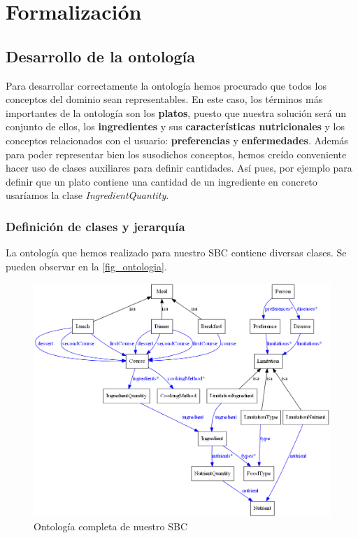 \documentclass[11]{article}
\begin{document}
\section{Formalización}

\subsection{Desarrollo de la ontología}
Para desarrollar correctamente la ontología hemos procurado que todos los conceptos del dominio sean representables. En este caso, los términos más importantes de la ontología son los \textbf{platos}, puesto que nuestra solución será un conjunto de ellos, los \textbf{ingredientes} y sus \textbf{características nutricionales} y los conceptos relacionados con el usuario: \textbf{preferencias} y \textbf{enfermedades}. Además para poder representar bien los susodichos conceptos, hemos creído conveniente hacer uso de clases auxiliares para definir cantidades. Así pues, por ejemplo para definir que un plato contiene una cantidad de un ingrediente en concreto usaríamos la clase \textit{IngredientQuantity}.
\label{ontologia_apartado}
\subsubsection{Definición de clases y jerarquía}

La ontología que hemos realizado para nuestro SBC contiene diversas clases. Se pueden observar en la \autoref{fig_ontologia}.

\begin{figure}[H]
\centering
\includegraphics[width=\textwidth,height=\textheight,keepaspectratio]{images/full_light.png}
\caption{Ontología completa de nuestro SBC}
\label{fig_ontologia}
\end{figure}
\end{document}
